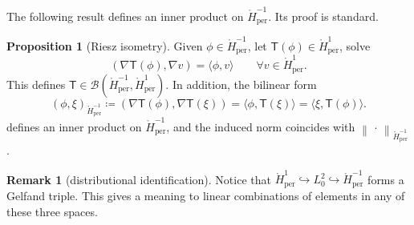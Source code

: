 \documentclass{amsart}
\newcommand{\bfx}{\boldsymbol{x}}
\newcommand{\Hm}{{\mathring H_{\mathrm{per}}^{-1}}}
\newcommand{\Homz}{{\mathring{H}_{\mathrm{per}}^{1}}}
\newcommand{\slot}{{\ \cdot \ }}
\newcommand{\calB}{{\mathcal{B}}}
\newcommand{\LL}{\mathcal{L}}
\newcommand{\LLinv}{{\mathcal{L}^{-1}}}
\newcommand{\norm}[2]{\left\| #1 \right\| _{#2}}
\newcommand{\iprd}[2]{\left( #1 , #2 \right)}
\newcommand{\RR}{\mathbb{R}}
\theoremstyle{definition}
\newtheorem{prop}[thm]{Proposition}
\newtheorem{cor}[thm]{Corollary}
\newtheorem{rmk}[thm]{Remark}
\begin{document}
The following result defines an inner product on $\Hm$. Its proof is standard.

\begin{prop}[Riesz isometry]\label{prop:Riesz}
  Given $\phi\in \Hm$, let $\mathsf{T}(\phi) \in \Homz$, solve
	\begin{equation}
		\iprd{\nabla \mathsf{T}(\phi)}{\nabla v} = \langle \phi,  v\rangle \qquad \forall  v\in \Homz.
		\label{eqn:poisson-weak}
	\end{equation}
	This defines $\mathsf{T} \in \calB(\Hm,\Homz)$. In addition, the bilinear form 
  \begin{equation}
    \left(\phi,\xi\right)_{\Hm} \coloneqq \iprd{\nabla \mathsf{T}(\phi)}{\nabla\mathsf{T}(\xi)} =\langle\phi,\mathsf{T}(\xi)\rangle  = \langle \xi, \mathsf{T}(\phi)\rangle.
    \label{obj:Hm-ip}
  \end{equation}
  defines an inner product on $\Hm$, and the induced norm coincides with $\norm{ \, \cdot \, }{\Hm}$.
\end{prop}

% 

\begin{rmk}[distributional identification]
	\label{rmk:identification}
	Notice that $\Homz \hookrightarrow L^2_0 \hookrightarrow \Hm$ forms a Gelfand triple. This gives a meaning to linear combinations of elements in any of these three spaces.
\end{rmk}

\end{document}
